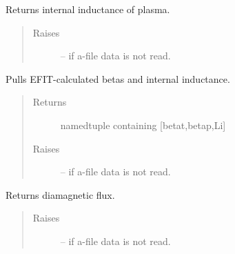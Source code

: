 \documentclass[letterpaper,10pt,english]{sphinxmanual}
\begin{document}
\begin{fulllineitems}
\begin{fulllineitems}
\begin{quote}
\begin{description}
\end{description}\end{quote}

\end{fulllineitems}


\begin{fulllineitems}
\label{eqtools:eqtools.eqdskreader.EqdskReader.getLi}
Returns internal inductance of plasma.
\begin{quote}\begin{description}
\item[{Raises }] \leavevmode
{} -- 
if a-file data is not read.

\end{description}\end{quote}

\end{fulllineitems}


\begin{fulllineitems}
\label{eqtools:eqtools.eqdskreader.EqdskReader.getBetas}
Pulls EFIT-calculated betas and internal inductance.
\begin{quote}\begin{description}
\item[{Returns}] \leavevmode
namedtuple containing {[}betat,betap,Li{]}

\item[{Raises }] \leavevmode
{} -- 
if a-file data is not read.

\end{description}\end{quote}

\end{fulllineitems}


\begin{fulllineitems}
\label{eqtools:eqtools.eqdskreader.EqdskReader.getDiamagFlux}
Returns diamagnetic flux.
\begin{quote}\begin{description}
\item[{Raises }] \leavevmode
{} -- 
if a-file data is not read.


\end{description}
\end{quote}
\end{fulllineitems}
\end{fulllineitems}
\end{document}

